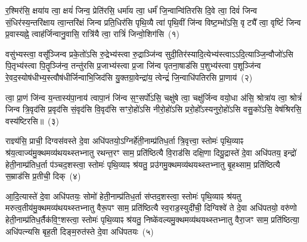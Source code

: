 {\anuvakamend[{सूर्य॑स्य॒ मनु॑षो मरुतः॒ पाव॑क॒ महो॑भी रथे॒शुभं॒ केन॒ षट्च॑त्वारिꣳशच्च}]}%


{\anuvakamend[{र॒श्मिर॑सि॒ राज्ञ्य॑स्य॒यं पु॒रो हरि॑केशो॒\-ऽग्निर्मू॒र्धेन्द्रा॒ग्निभ्यां॒ बृह॒स्पति॑र्भूय॒स्कृद॑स्य॒ग्निना॑ विश्वा॒षाट्प्र॒जा\-प॑ति॒र्मन॑सा॒ कृत्ति॑का॒ मधु॑श्च स॒मिद्दि॒शां द्वाद॑श}]}%
{}

\setcounter{anuvakam}{0}
र॒श्मिर॑सि॒ क्षया॑य त्वा॒ क्षयं॑ जिन्व॒ प्रेति॑रसि॒ धर्मा॑य त्वा॒ धर्मं॑ जि॒न्वान्वि॑तिरसि दि॒वे त्वा॒ दिवं॑ जिन्व सं॒धिर॑स्य॒न्तरि॑क्षाय त्वा॒न्तरि॑क्षं जिन्व प्रति॒धिर॑सि पृथि॒व्यै त्वा॑ पृथि॒वीं जि॑न्व विष्ट॒म्भो॑\-ऽसि॒ वृट्यै᳚ त्वा॒ वृष्टिं॑ जिन्व प्र॒वास्यह्ने॒ त्वाह॑र्जिन्वानु॒वासि॒ रात्रि॑यै त्वा॒ रात्रिं॑ जिन्वो॒शिग॑सि~(१)

वसु॑भ्यस्त्वा॒ वसू᳚ञ्जिन्व प्रके॒तो॑\-ऽसि रु॒द्रेभ्य॑स्त्वा रु॒द्राञ्जि॑न्व सुदी॒तिर॑स्यादि॒त्येभ्य॑स्त्वा\-ऽ\-ऽदि॒त्याञ्जि॒न्वौजो॑\-ऽसि पि॒तृभ्य॑स्त्वा पि॒तॄञ्जि॑न्व॒ तन्तु॑रसि प्र॒जाभ्य॑स्त्वा प्र॒जा जि॑न्व पृतना॒षाड॑सि प॒शुभ्य॑स्त्वा प॒शूञ्जि॑न्व रे॒वद॒स्योष॑धीभ्य॒स्त्वौष॑धीर्जिन्वाभि॒जिद॑सि यु॒क्तग्रा॒वेन्द्रा॑य॒ त्वेन्द्रं॑ जि॒न्वाधि॑पतिरसि प्रा॒णाय॑~(२)

त्वा॒ प्रा॒णं जि॑न्व य॒न्तास्य॑पा॒नाय॑ त्वापा॒नं जि॑न्व स॒ꣳ॒सर्पो॑\-ऽसि॒ चक्षु॑षे त्वा॒ चक्षु॑र्जिन्व वयो॒धा अ॑सि॒ श्रोत्रा॑य त्वा॒ श्रोत्रं॑ जिन्व त्रि॒वृद॑सि प्र॒वृद॑सि सं॒वृद॑सि वि॒वृद॑सि सꣳरो॒हो॑\-ऽसि नीरो॒हो॑\-ऽसि प्ररो॒हो᳚\-ऽस्यनुरो॒हो॑\-ऽसि वसु॒को॑\-ऽसि॒ वेष॑श्रिरसि॒ वस्य॑ष्टिरसि॥~(३)

{\anuvakamend[{उ॒शिग॑सि प्रा॒णाय॒ त्रिच॑त्वारिꣳशच्च}]}%

राज्ञ्य॑सि॒ प्राची॒ दिग्वस॑वस्ते दे॒वा अधि॑पतयो॒\-ऽग्निर्\mbox{}हे॑ती॒नाम्प्र॑तिध॒र्ता त्रि॒वृत्त्वा॒ स्तोमः॑ पृथि॒व्याꣴ श्र॑य॒त्वाज्य॑मु॒क्थ\-मव्य॑थयथ्स्तभ्नातु रथन्त॒रꣳ साम॒ प्रति॑ष्ठित्यै वि॒राड॑सि दक्षि॒णा दिग्रु॒द्रास्ते॑ दे॒वा अधि॑पतय॒ इन्द्रो॑ हेती॒नाम्प्र॑तिध॒र्ता प॑ञ्चद॒शस्त्वा॒ स्तोमः॑ पृथि॒व्याꣴ श्र॑यतु॒ प्रउ॑गमु॒क्थमव्य॑थयथ्स्तभ्नातु बृ॒हथ्साम॒ प्रति॑ष्ठित्यै स॒म्राड॑सि प्र॒तीची॒ दिक्~(४)

आ॒दि॒त्यास्ते॑ दे॒वा अधि॑पतयः॒ सोमो॑ हेती॒नाम्प्र॑तिध॒र्ता स॑प्तद॒शस्त्वा॒ स्तोमः॑ पृथि॒व्याꣴ श्र॑यतु मरुत्व॒तीय॑मु॒क्थ\-मव्य॑थयथ्स्तभ्नातु वैरू॒पꣳ साम॒ प्रति॑ष्ठित्यै स्व॒राड॒स्युदी॑ची॒ दिग्विश्वे॑ ते दे॒वा अधि॑पतयो॒ वरु॑णो हेती॒नाम्प्र॑तिध॒र्तैक॑\-वि॒ꣳ॒शस्त्वा॒ स्तोमः॑ पृथि॒व्याꣴ श्र॑यतु॒ निष्के॑वल्यमु॒क्थमव्य॑थयथ्स्तभ्नातु वैरा॒जꣳ साम॒ प्रति॑ष्ठित्या॒ अधि॑पत्न्यसि बृह॒ती दिङ्म॒रुत॑स्ते दे॒वा अधि॑पतयः~(५)

